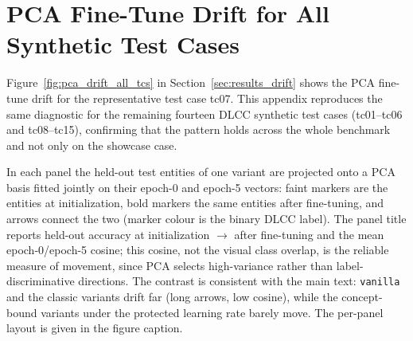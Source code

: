 \documentclass[a4paper,oneside,bibliography=totoc]{scrbook}
\begin{document}
\section{PCA Fine-Tune Drift for All Synthetic Test Cases}
\label{app:pca-drift-all}

Figure~\ref{fig:pca_drift_all_tcs} in Section~\ref{sec:results_drift} shows the
PCA fine-tune drift for the representative test case tc07. This appendix
reproduces the same diagnostic for the remaining fourteen DLCC synthetic test
cases (tc01--tc06 and tc08--tc15), confirming that the pattern holds across the
whole benchmark and not only on the showcase case.

In each panel the held-out test entities of one variant are projected onto a PCA
basis fitted jointly on their epoch-0 and epoch-5 vectors: faint markers are the
entities at initialization, bold markers the same entities after fine-tuning,
and arrows connect the two (marker colour is the binary DLCC label). The panel
title reports held-out accuracy at initialization $\rightarrow$ after
fine-tuning and the mean epoch-0/epoch-5 cosine; this cosine, not the visual
class overlap, is the reliable measure of movement, since PCA selects
high-variance rather than label-discriminative directions. The contrast is
consistent with the main text: \texttt{vanilla} and the classic variants drift
far (long arrows, low cosine), while the concept-bound variants under the
protected learning rate barely move. The per-panel layout is given in the figure
caption.
\end{document}
